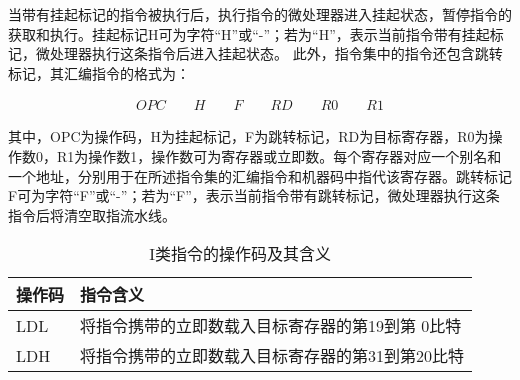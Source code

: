 当带有挂起标记的指令被执行后，执行指令的微处理器进入挂起状态，暂停指令的获取和执行。挂起标记H可为字符“H”或“-”；若为“H”，表示当前指令带有挂起标记，微处理器执行这条指令后进入挂起状态。
此外，指令集中的指令还包含跳转标记，其汇编指令的格式为：

\begin{align}
    OPC \qquad H \qquad F \qquad RD \qquad R0 \qquad R1
\end{align}

其中，OPC为操作码，H为挂起标记，F为跳转标记，RD为目标寄存器，R0为操作数0，R1为操作数1，操作数可为寄存器或立即数。每个寄存器对应一个别名和一个地址，分别用于在所述指令集的汇编指令和机器码中指代该寄存器。跳转标记F可为字符“F”或“-”；若为“F”，表示当前指令带有跳转标记，微处理器执行这条指令后将清空取指流水线。

\begin{table}
    \centering
    \caption[I类指令的操作码及其含义]{I类指令的操作码及其含义\label{tb:i_instructions}}
    \begin{tabular}{C{2cm}|C{12cm}}
        \toprule
        操作码 & 指令含义 \\
        \midrule
        LDL & 将指令携带的立即数载入目标寄存器的第19到第 0比特\\
        LDH & 将指令携带的立即数载入目标寄存器的第31到第20比特\\
        \bottomrule
    \end{tabular}
\end{table}


